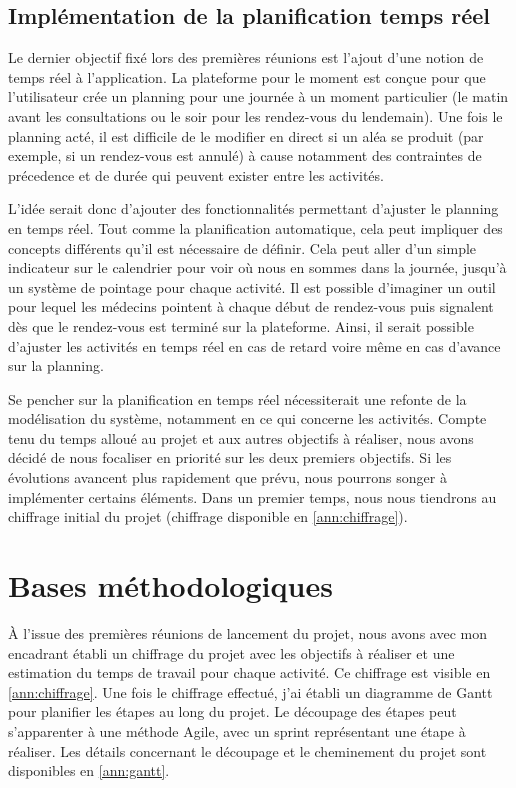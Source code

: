 \documentclass{polytech/polytech}
\begin{document}
\subsection{Implémentation de la planification temps réel}

Le dernier objectif fixé lors des premières réunions est l'ajout d'une notion de temps réel à l'application. La plateforme pour le moment est conçue pour que l'utilisateur crée un planning pour une journée à un moment particulier (le matin avant les consultations ou le soir pour les rendez-vous du lendemain). Une fois le planning acté, il est difficile de le modifier en direct si un aléa se produit (par exemple, si un rendez-vous est annulé) à cause notamment des contraintes de précedence et de durée qui peuvent exister entre les activités. 

L'idée serait donc d'ajouter des fonctionnalités permettant d'ajuster le planning en temps réel. Tout comme la planification automatique, cela peut impliquer des concepts différents qu'il est nécessaire de définir. Cela peut aller d'un simple indicateur sur le calendrier pour voir où nous en sommes dans la journée, jusqu'à un système de pointage pour chaque activité. Il est possible d'imaginer un outil pour lequel les médecins pointent à chaque début de rendez-vous puis signalent dès que le rendez-vous est terminé sur la plateforme. Ainsi, il serait possible d'ajuster les activités en temps réel en cas de retard voire même en cas d'avance sur la planning. 

Se pencher sur la planification en temps réel nécessiterait une refonte de la modélisation du système, notamment en ce qui concerne les activités. Compte tenu du temps alloué au projet et aux autres objectifs à réaliser, nous avons décidé de nous focaliser en priorité sur les deux premiers objectifs. Si les évolutions avancent plus rapidement que prévu, nous pourrons songer à implémenter certains éléments. Dans un premier temps, nous nous tiendrons au chiffrage initial du projet (chiffrage disponible en \autoref{ann:chiffrage}).


\section{Bases méthodologiques}

À l'issue des premières réunions de lancement du projet, nous avons avec mon encadrant établi un chiffrage du projet avec les objectifs à réaliser et une estimation du temps de travail pour chaque activité. Ce chiffrage est visible en \autoref{ann:chiffrage}. Une fois le chiffrage effectué, j'ai établi un diagramme de Gantt pour planifier les étapes au long du projet. Le découpage des étapes peut s'apparenter à une méthode Agile, avec un sprint représentant une étape à réaliser. Les détails concernant le découpage et le cheminement du projet sont disponibles en \autoref{ann:gantt}.
\end{document}
